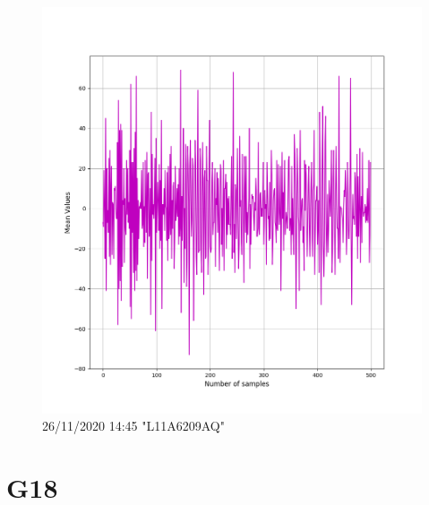 \documentclass[hidelinks, 12pt, a4paper]{article}
\begin{document}
\begin{figure}[h!]
\centering
	\includegraphics[height=.38\textheight, width=\textwidth]{assets/session1/g17.png}
    \caption{26/11/2020 14:45 "L11A6209AQ"}
\end{figure}



\section{G18}
\end{document}
